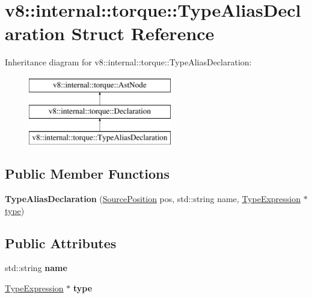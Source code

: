 \hypertarget{structv8_1_1internal_1_1torque_1_1TypeAliasDeclaration}{}\section{v8\+:\+:internal\+:\+:torque\+:\+:Type\+Alias\+Declaration Struct Reference}
\label{structv8_1_1internal_1_1torque_1_1TypeAliasDeclaration}
Inheritance diagram for v8\+:\+:internal\+:\+:torque\+:\+:Type\+Alias\+Declaration\+:\begin{figure}[H]
\begin{center}
\leavevmode
\includegraphics[height=3.000000cm]{structv8_1_1internal_1_1torque_1_1TypeAliasDeclaration}
\end{center}
\end{figure}
\subsection*{Public Member Functions}
\begin{DoxyCompactItemize}
\item 
\mbox{\label{structv8_1_1internal_1_1torque_1_1TypeAliasDeclaration_ac661e824942888dab4deacf556b16e2e}} 
{\bfseries Type\+Alias\+Declaration} (\mbox{\hyperlink{structv8_1_1internal_1_1torque_1_1SourcePosition}{Source\+Position}} pos, std\+::string name, \mbox{\hyperlink{structv8_1_1internal_1_1torque_1_1TypeExpression}{Type\+Expression}} $\ast$\mbox{\hyperlink{classstd_1_1conditional_1_1type}{type}})
\end{DoxyCompactItemize}
\subsection*{Public Attributes}
\begin{DoxyCompactItemize}
\item 
\mbox{\label{structv8_1_1internal_1_1torque_1_1TypeAliasDeclaration_a8ac5793e31c73e681412482d8d04b1f1}} 
std\+::string {\bfseries name}
\item 
\mbox{\label{structv8_1_1internal_1_1torque_1_1TypeAliasDeclaration_ad8851e64b1389f588db61eae208efc55}} 
\mbox{\hyperlink{structv8_1_1internal_1_1torque_1_1TypeExpression}{Type\+Expression}} $\ast$ {\bfseries type}
\end{DoxyCompactItemize}

